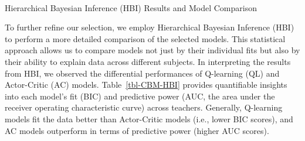 \documentclass[
  number,
  preprint,
  3p,
  onecolumn]{elsarticle}
\makeatletter
\let\oldparagraph\paragraph
\renewcommand{\paragraph}{
    \@ifstar
      \xxxParagraphStar
      \xxxParagraphNoStar
  }
\newcommand{\xxxParagraphStar}[1]{\oldparagraph*{#1}\mbox{}}
\newcommand{\xxxParagraphNoStar}[1]{\oldparagraph{#1}\mbox{}}
\makeatother
\begin{document}
\paragraph{Hierarchical Bayesian Inference (HBI) Results and Model
Comparison}\label{hierarchical-bayesian-inference-hbi-results-and-model-comparison}

To further refine our selection, we employ Hierarchical Bayesian
Inference (HBI) to perform a more detailed comparison of the selected
models. This statistical approach allows us to compare models not just
by their individual fits but also by their ability to explain data
across different subjects. In interpreting the results from HBI, we
observed the differential performances of Q-learning (QL) and
Actor-Critic (AC) models. Table~\ref{tbl-CBM-HBI} provides quantifiable
insights into each model's fit (BIC) and predictive power (AUC, the area
under the receiver operating characteristic curve) across teachers.
Generally, Q-learning models fit the data better than Actor-Critic
models (i.e., lower BIC scores), and AC models outperform in terms of
predictive power (higher AUC scores).
\end{document}
